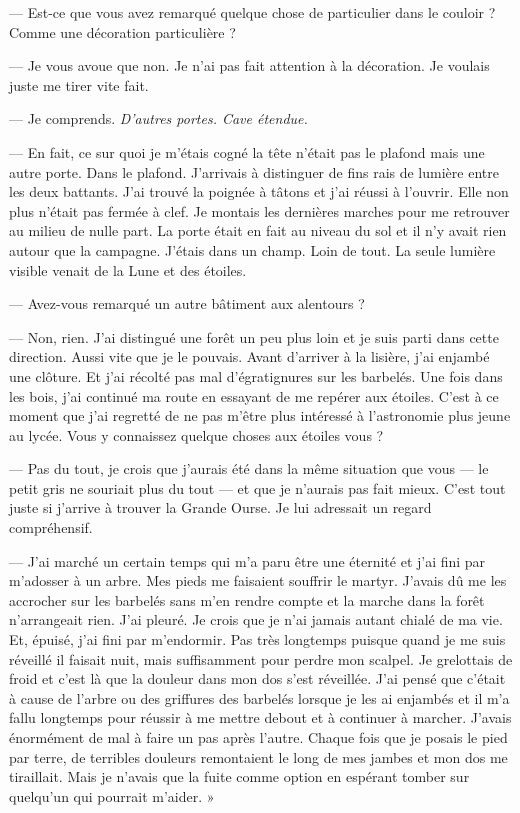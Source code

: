— Est-ce que vous avez remarqué quelque chose de particulier dans le couloir ? Comme une décoration particulière ?

— Je vous avoue que non. Je n'ai pas fait attention à la décoration. Je voulais juste me tirer vite fait.

— Je comprends. \emph{D'autres portes. Cave étendue.}

— En fait, ce sur quoi je m'étais cogné la tête n'était pas le plafond mais une autre porte. Dans le plafond. J'arrivais
à distinguer de fins rais de lumière entre les deux battants. J'ai trouvé la poignée à tâtons et j'ai réussi à l'ouvrir.
Elle non plus n'était pas fermée à clef. Je montais les dernières marches pour me retrouver au milieu de nulle part. La
porte était en fait au niveau du sol et il n'y avait rien autour que la campagne. J'étais dans un champ. Loin de tout.
La seule lumière visible venait de la Lune et des étoiles.

— Avez-vous remarqué un autre bâtiment aux alentours ?

— Non, rien. J'ai distingué une forêt un peu plus loin et je suis parti dans cette direction. Aussi vite que je le
pouvais. Avant d'arriver à la lisière, j'ai enjambé une clôture. Et j'ai récolté pas mal d'égratignures sur les
barbelés. Une fois dans les bois, j'ai continué ma route en essayant de me repérer aux étoiles. C'est à ce moment que
j'ai regretté de ne pas m'être plus intéressé à l'astronomie plus jeune au lycée. Vous y connaissez quelque choses aux
étoiles vous ?

— Pas du tout, je crois que j'aurais été dans la même situation que vous — le petit gris ne souriait plus du tout — et
que je n'aurais pas fait mieux. C'est tout juste si j'arrive à trouver la Grande Ourse. Je lui adressait un regard
compréhensif.

— J'ai marché un certain temps qui m'a paru être une éternité et j'ai fini par m'adosser à un arbre. Mes pieds me
faisaient souffrir le martyr. J'avais dû me les accrocher sur les barbelés sans m'en rendre compte et la marche dans la
forêt n'arrangeait rien. J'ai pleuré. Je crois que je n'ai jamais autant chialé de ma vie. Et, épuisé, j'ai fini par
m'endormir. Pas très longtemps puisque quand je me suis réveillé il faisait nuit, mais suffisamment pour perdre mon
scalpel. Je grelottais de froid et c'est là que la douleur dans mon dos s'est réveillée. J'ai pensé que c'était à 
cause de l'arbre ou des griffures des barbelés lorsque je les ai enjambés et il m'a fallu longtemps pour réussir à me 
mettre debout et à continuer à marcher.
J'avais énormément de mal à faire un pas après l'autre. Chaque fois que je posais le pied par terre, de terribles
douleurs remontaient le long de mes jambes et mon dos me tiraillait. Mais je n'avais que la fuite comme option en 
espérant tomber sur quelqu'un qui pourrait m'aider. »

